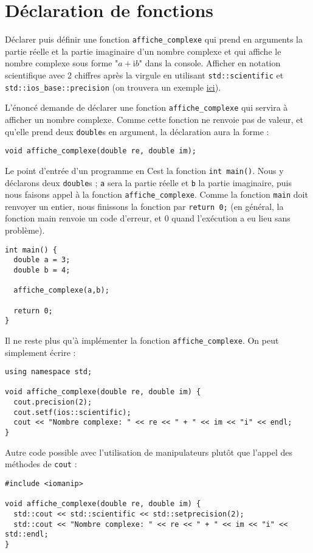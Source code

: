 \documentclass{book}
\newcommand{\inline}[1]{\texttt{#1}}
\newcommand{\cpp}{\mbox{C\vspace{.5em}\protect\raisebox{.2ex}{\footnotesize++~}}}
\begin{document}
\section{Déclaration de fonctions}

Déclarer puis définir une fonction \inline{affiche_complexe} qui prend en arguments la partie réelle et la partie imaginaire d'un nombre complexe et qui affiche le nombre complexe sous forme "$a+\mathrm{i}b$" dans la console. Afficher en notation scientifique avec 2 chiffres après la virgule en utilisant \inline{std::scientific} et \inline{std::ios_base::precision} (on trouvera un exemple \href{https://cplusplus.com/reference/ios/ios_base/precision/}{ici}).

\begin{correction}
L'énoncé demande de déclarer une fonction \inline{affiche_complexe} qui servira à afficher un nombre complexe. Comme cette fonction ne renvoie pas de valeur, et qu'elle prend deux \inline{double}s en argument, la déclaration aura la forme :
\begin{verbatim}
void affiche_complexe(double re, double im);
\end{verbatim}

Le point d'entrée d'un programme en \cpp est la fonction \inline{int main()}. Nous y déclarons deux \inline{double}s ; \inline{a} sera la partie réelle et \inline{b} la partie imaginaire, puis nous faisons appel à la fonction \inline{affiche_complexe}. Comme la fonction \inline{main} doit renvoyer un entier, nous finissons la fonction par \inline{return 0;} (en général, la fonction main renvoie un code d'erreur, et 0 quand l'exécution a eu lieu sans problème).

\begin{verbatim}
int main() {
  double a = 3;
  double b = 4;

  affiche_complexe(a,b);

  return 0;
}
\end{verbatim}

Il ne reste plus qu'à implémenter la fonction \inline{affiche_complexe}. On peut simplement écrire :
\begin{verbatim}
using namespace std;

void affiche_complexe(double re, double im) {
  cout.precision(2);
  cout.setf(ios::scientific);
  cout << "Nombre complexe: " << re << " + " << im << "i" << endl;
}
\end{verbatim}

Autre code possible avec l'utilisation de manipulateurs plutôt que l'appel des méthodes de \texttt{cout} :
\begin{verbatim}
#include <iomanip>

void affiche_complexe(double re, double im) {
  std::cout << std::scientific << std::setprecision(2);
  std::cout << "Nombre complexe: " << re << " + " << im << "i" << std::endl;
}
\end{verbatim}

\end{correction}
\end{document}
